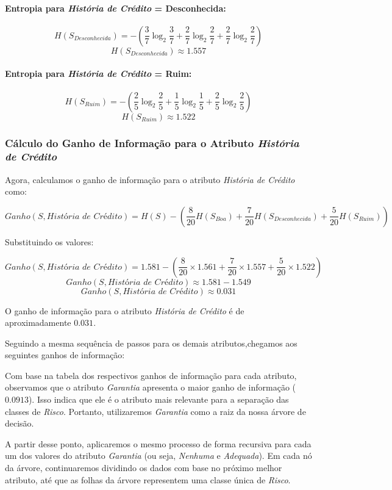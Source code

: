 \documentclass[a4paper,12pt]{article}
\begin{document}
\paragraph{Entropia para \textit{História de Crédito} = Desconhecida:}
\[
H(S_{Desconhecida}) = -\left(\frac{3}{7} \log_2 \frac{3}{7} + \frac{2}{7} \log_2 \frac{2}{7} + \frac{2}{7} \log_2 \frac{2}{7}\right)
\]
\[
H(S_{Desconhecida}) \approx 1.557
\]

\paragraph{Entropia para \textit{História de Crédito} = Ruim:}
\[
H(S_{Ruim}) = -\left(\frac{2}{5} \log_2 \frac{2}{5} + \frac{1}{5} \log_2 \frac{1}{5} + \frac{2}{5} \log_2 \frac{2}{5}\right)
\]
\[
H(S_{Ruim}) \approx 1.522
\]

\subsubsection{Cálculo do Ganho de Informação para o Atributo \textit{História de Crédito}}
Agora, calculamos o ganho de informação para o atributo \textit{História de Crédito} como:

\[
Ganho(S, \textit{História de Crédito}) = H(S) - \left(\frac{8}{20}H(S_{Boa}) + \frac{7}{20}H(S_{Desconhecida}) + \frac{5}{20}H(S_{Ruim})\right)
\]

Substituindo os valores:

\[
Ganho(S, \textit{História de Crédito}) = 1.581 - \left(\frac{8}{20} \times 1.561 + \frac{7}{20} \times 1.557 + \frac{5}{20} \times 1.522\right)
\]
\[
Ganho(S, \textit{História de Crédito}) \approx 1.581 - 1.549
\]
\[
Ganho(S, \textit{História de Crédito}) \approx 0.031
\]

O ganho de informação para o atributo \textit{História de Crédito} é de aproximadamente \(0.031\).

Seguindo a mesma sequência de passos para os demais atributos,chegamos aos seguintes ganhos de informação:


Com base na tabela dos respectivos ganhos de informação para cada atributo, observamos que o atributo \textit{Garantia} apresenta o maior ganho de informação (\(0.0913\)). Isso indica que ele é o atributo mais relevante para a separação das classes de \textit{Risco}. Portanto, utilizaremos \textit{Garantia} como a raiz da nossa árvore de decisão.

A partir desse ponto, aplicaremos o mesmo processo de forma recursiva para cada um dos valores do atributo \textit{Garantia} (ou seja, \textit{Nenhuma} e \textit{Adequada}). Em cada nó da árvore, continuaremos dividindo os dados com base no próximo melhor atributo, até que as folhas da árvore representem uma classe única de \textit{Risco}.
\end{document}
